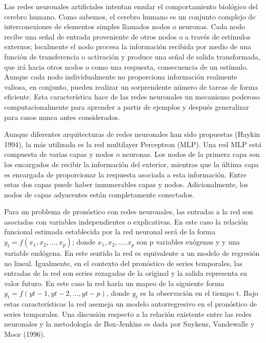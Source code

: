 \hspace*{0.4 cm} Las redes neuronales artificiales intentan emular el comportamiento biol\'ogico del cerebro humano. Como sabemos, el cerebro humano es un conjunto complejo de interconexiones de elementos simples llamados nodos o neuronas. Cada nodo recibe una se\~nal de entrada proveniente de otros nodos o a trav\'es de est\'imulos externos; localmente el nodo procesa la informaci\'on recibida por medio de una funci\'on de transferencia o activaci\'on y produce una se\~nal de salida transformada, que ir\'a hacia otros nodos o como una respuesta, consecuencia de un est\'imulo. Aunque cada nodo individualmente no proporciona informaci\'on realmente valiosa, en conjunto, pueden realizar un sorprendente n\'umero de tareas de forma eficiente. Esta caracter\'istica hace de las redes neuronales un mecanismo poderoso computacionalmente para aprender a partir de ejemplos y despu\'es generalizar para casos nunca antes considerados.


\hspace*{0.4 cm} Aunque diferentes arquitecturas de redes neuronales han sido propuestas (Haykin 1994), la m\'as utilizada es la red multilayer Perceptron (MLP). Una red MLP est\'a compuesta de varias capas y nodos o neuronas. Los nodos de la primera capa son los encargados de recibir la informaci\'on del exterior, mientras que la \'ultima capa es encargada de proporcionar la respuesta asociada a esta informaci\'on. Entre estas dos capas puede haber innumerables capas y nodos. Adicionalmente, los nodos de capas adyacentes est\'an completamente conectados.

\hspace*{0.4 cm} Para un problema de pron\'ostico con redes neuronales, las entradas a la red son asociadas con variables independientes o explicativas. En este caso la relaci\'on funcional estimada establecida por la red neuronal ser\'a de la forma $y_{t}=f(x_{1}, x_{2},..., x_{p})$; donde $x_{1}, x_{2},..., x_{p}$ son p variables ex\'ogenas y y una variable end\'ogena. En este sentido la red es equivalente a un modelo de regresi\'on no lineal. Igualmente, en el contexto del pron\'ostico de series temporales, las entradas de la red son series rezagadas de la original y la salida representa su valor futuro. En este caso la red har\'ia un mapeo de la siguiente forma $y_{t}= f (y{t-1}, y{t-2}, ..., y{t-p})$, donde $y_{t}$ es la observaci\'on en el tiempo t. Bajo estas caracter\'isticas la red asemeja un modelo autorregresivo en el pron\'ostico de series temporales. Una discusi\'on respecto a la relaci\'on existente entre las redes neuronales y la metodolog\'ia de Box-Jenkins es dada por Suykens, Vandewalle y Moor (1996).

